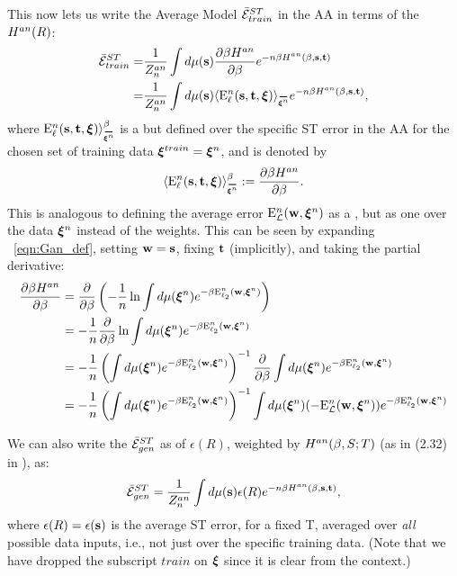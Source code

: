 This now lets us write the Average Model \TrainingError $\bar{\mathcal{E}}^{ST}_{train}$ in the AA in terms of the \AnnealedHamiltonian $H^{an}(R)$:
  \begin{align}
  \nonumber
  \AVGSTTE
   =& \dfrac{1}{Z^{an}_{\ND}}\int d\mu(\SVEC)\dfrac{\partial \beta\HAN}{\partial \beta} e^{-\ND\beta\HAN(\beta,\SVEC,\TVEC)} \\ 
  \label{eqn:EtM2}
   =& \dfrac{1}{Z^{an}_{\ND}}\int d\mu(\SVEC)\langle  \DELBFell(\SVEC,\TVEC,\XI) \rangle_{\AVGNDXI} e^{-\ND\beta\HAN(\beta,\SVEC,\TVEC)}  ,
  \end{align}
  where $\DELBFell(\SVEC,\TVEC,\XI) \rangle^{\beta}_{\AVGNDXI}$
  is a \ThermalAverage but defined over the specific ST error in the AA for the chosen set of training data $\boldsymbol{\xi}^{train}=\boldsymbol{\xi}^{n}$, and is denoted by 
 \begin{align}
   \langle  \DELBFell(\SVEC,\TVEC,\XI) \rangle^{\beta}_{\AVGNDXI}:=\dfrac{\partial \beta\HAN}{\partial \beta}.
 \end{align}
 This is analogous to defining the average error $\mathbf{\mathrm{E}}^{n}_{\mathcal{L}}(\mathbf{w}, \boldsymbol{\xi}^{n})$ as a \ThermalAverage, but as one over the data $\boldsymbol{\xi}^{n}$ instead of the weights.  This can be seen by expanding \EQN~\ref{eqn:Gan_def}, setting ${\mathbf{w}}={\mathbf{s}}$, fixing ${\mathbf{t}}$ (implicitly), and taking the partial derivative:
 \begin{align}
  \label{eqn:partial_Gan}
  \dfrac{\partial \beta H^{an}}{\partial \beta}
  &=  \dfrac{\partial }{\partial \beta} \left(-\frac{1}{n}\ln \int d\mu(\boldsymbol{\xi}^{n})e^{-\beta\mathbf{\mathrm{E}}^{n}_{\ell_2}(\mathbf{w}, \boldsymbol{\xi}^{n})}\right) \\ \nonumber
  &=  -\frac{1}{n}\dfrac{\partial }{\partial \beta} \ln \int d\mu(\boldsymbol{\xi}^{n})e^{-\beta\mathbf{\mathrm{E}}^{n}_{\ell_2}(\mathbf{w}, \boldsymbol{\xi}^{n})} \\ \nonumber
  &=  -\frac{1}{n} \left( \int d\mu(\boldsymbol{\xi}^{n})e^{-\beta\mathbf{\mathrm{E}}^{n}_{\ell_2}(\mathbf{w}, \boldsymbol{\xi}^{n})}\right)^{-1}\dfrac{\partial }{\partial \beta} \int d\mu(\boldsymbol{\xi}^{n})e^{-\beta\mathbf{\mathrm{E}}^{n}_{\ell_2}(\mathbf{w}, \boldsymbol{\xi}^{n})} \\ \nonumber
    &=  -\frac{1}{n} \left(\int d\mu(\boldsymbol{\xi}^{n})e^{-\beta\mathbf{\mathrm{E}}^{n}_{\ell_2}(\mathbf{w}, \boldsymbol{\xi}^{n})}\right)^{-1} \int d\mu(\boldsymbol{\xi}^{n})(-\mathbf{\mathrm{E}}^{n}_{\mathcal{L}}(\mathbf{w}, \boldsymbol{\xi}^{n}))e^{-\beta\mathbf{\mathrm{E}}^{n}_{\ell_2}(\mathbf{w}, \boldsymbol{\xi}^{n})}
 \end{align}

We can also write the \ModelGeneralizationError $\bar{\mathcal{E}}^{ST}_{gen}$  as \BoltzmannWeightedAverage
of $\epsilon(R)$, weighted by $H^{an}(\beta,S;T)$ (as in (2.32) in \cite{SST92}), as:
\begin{align}
\label{eqn:EgCanonical}
\bar{\mathcal{E}}^{ST}_{gen}=\dfrac{1}{Z^{an}_{n}}\int d\mu({\mathbf{s}})\epsilon(R)e^{-n\beta H^{an}(\beta,{\mathbf{s}},{\mathbf{t}})} ,
\end{align}
where $\epsilon(R)=\epsilon({\mathbf{s}})$ is the average ST error, for a fixed \Teacher T,
averaged over \emph{all} possible data inputs, i.e., not just over the specific training data.
(Note that we have dropped the subscript $train$ on $\boldsymbol{\xi}$ since it is clear from the context.)


